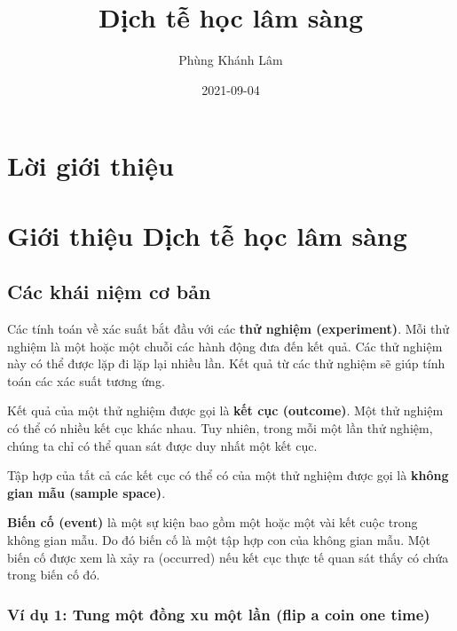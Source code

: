 \documentclass[
]{book}
\title{Dịch tễ học lâm sàng}
\author{Phùng Khánh Lâm}
\date{2021-09-04}
\begin{document}
\maketitle

{
\setcounter{tocdepth}{1}
\tableofcontents
}
\hypertarget{lux1eddi-giux1edbi-thiux1ec7u}{%
\chapter*{Lời giới thiệu}\label{lux1eddi-giux1edbi-thiux1ec7u}}

\hypertarget{intro}{%
\chapter{Giới thiệu Dịch tễ học lâm sàng}\label{intro}}

\hypertarget{cuxe1c-khuxe1i-niux1ec7m-cux1a1-bux1ea3n}{%
\section{Các khái niệm cơ bản}\label{cuxe1c-khuxe1i-niux1ec7m-cux1a1-bux1ea3n}}

Các tính toán về xác suất bắt đầu với các \textbf{thử nghiệm (experiment)}. Mỗi thử nghiệm là một hoặc một chuỗi các hành động đưa đến kết quả. Các thử nghiệm này có thể được lặp đi lặp lại nhiều lần. Kết quả từ các thử nghiệm sẽ giúp tính toán các xác suất tương ứng.

Kết quả của một thử nghiệm được gọi là \textbf{kết cục (outcome)}. Một thử nghiệm có thể có nhiều kết cục khác nhau. Tuy nhiên, trong mỗi một lần thử nghiệm, chúng ta chỉ có thể quan sát được duy nhất một kết cục.

Tập hợp của tất cả các kết cục có thể có của một thử nghiệm được gọi là \textbf{không gian mẫu (sample space)}.

\textbf{Biến cố (event)} là một sự kiện bao gồm một hoặc một vài kết cuộc trong không gian mẫu. Do đó biến cố là một tập hợp con của không gian mẫu. Một biến cố được xem là xảy ra (occurred) nếu kết cục thực tế quan sát thấy có chứa trong biến cố đó.

\hypertarget{vuxed-dux1ee5-1-tung-mux1ed9t-ux111ux1ed3ng-xu-mux1ed9t-lux1ea7n-flip-a-coin-one-time}{%
\subsection{Ví dụ 1: Tung một đồng xu một lần (flip a coin one time)}\label{vuxed-dux1ee5-1-tung-mux1ed9t-ux111ux1ed3ng-xu-mux1ed9t-lux1ea7n-flip-a-coin-one-time}}
\end{document}
